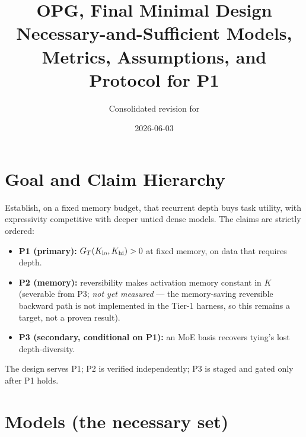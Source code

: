 \documentclass[11pt]{article}
\title{OPG, Final Minimal Design\\
\large Necessary-and-Sufficient Models, Metrics, Assumptions, and Protocol for P1}
\author{Consolidated revision for \code{train\_gpt.py}}
\date{2026-06-03}
\begin{document}
\maketitle

\section{Goal and Claim Hierarchy}
Establish, on a fixed memory budget, that recurrent depth buys task utility, with expressivity competitive with deeper untied dense models. The claims are strictly ordered:
\begin{itemize}[leftmargin=1.4em,itemsep=1pt]
  \item \textbf{P1 (primary):} $G_T(K_{\rm lo},K_{\rm hi})>0$ at fixed memory, on data that requires depth.
  \item \textbf{P2 (memory):} reversibility makes activation memory constant in $K$ (severable from P3; \emph{not yet measured} --- the memory-saving reversible backward path is not implemented in the Tier-1 harness, so this remains a target, not a proven result).
  \item \textbf{P3 (secondary, conditional on P1):} an MoE basis recovers tying's lost depth-diversity.
\end{itemize}
The design serves P1; P2 is verified independently; P3 is staged and gated only after P1 holds.

\section{Models (the necessary set)}
\end{document}
